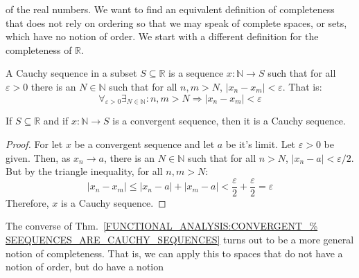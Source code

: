         of the real numbers.
        We want to find an equivalent definition
        of completeness that does not rely on ordering
        so that we may speak of complete spaces,
        or sets, which have no notion of
        order. We start with a different definition
        for the completeness of $\mathbb{R}$.
        \begin{definition}
            A Cauchy sequence in a subset
            $S\subseteq\mathbb{R}$ is a
            sequence $x:\mathbb{N}\rightarrow{S}$
            such that for all $\varepsilon>0$ there
            is an $N\in\mathbb{N}$ such that for all
            $n,m>N$, $|x_{n}-x_{m}|<\varepsilon$.
            That is:
            \begin{equation}
                \label{thm:Func_Def_Cauchy_Sequence}
                \forall_{\varepsilon>0}
                \exists_{N\in\mathbb{N}}:
                n,m>N\Rightarrow
                |x_{n}-x_{m}|<\varepsilon
            \end{equation}
        \end{definition}
        \begin{theorem}
            \label{FUNCTIONAL_ANALYSIS:CONVERGENT_%
                   SEEQUENCES_ARE_CAUCHY_SEQUENCES}
            If $S\subseteq\mathbb{R}$ and if
            $x:\mathbb{N}\rightarrow{S}$
            is a convergent sequence, then it
            is a Cauchy sequence.
        \end{theorem}
        \begin{proof}
            For let $x$ be a convergent sequence and
            let $a$ be it's limit.
            Let $\varepsilon>0$ be given. Then, as
            $x_{n}\rightarrow{a}$, there is an
            $N\in\mathbb{N}$ such that for all $n>N$,
            $|x_{n}-a|<\varepsilon/2$.
            But by the triangle inequality,
            for all $n,m>N$:
            \begin{equation}
                |x_{n}-x_{m}|\leq
                |x_{n}-a|+|x_{m}-a|<
                \frac{\varepsilon}{2}+
                \frac{\varepsilon}{2}
                =\varepsilon
            \end{equation}
            Therefore, $x$ is a Cauchy sequence.
        \end{proof}
        The converse of
        Thm.~\ref{FUNCTIONAL_ANALYSIS:CONVERGENT_%
                  SEEQUENCES_ARE_CAUCHY_SEQUENCES}
        turns out to be a more general notion
        of completeness. That is, we can apply
        this to spaces that do not have
        a notion of order, but do have a notion
